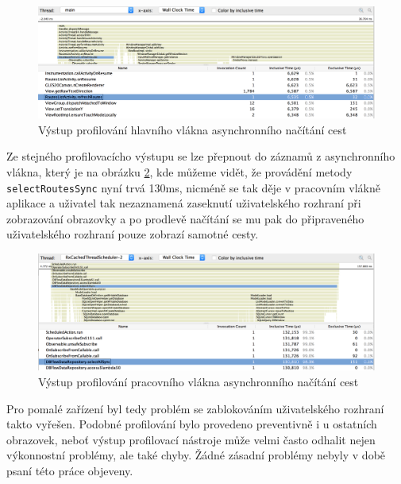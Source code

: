 \documentclass[czech,master,public,dept460,male,java,cpdeclaration]{diploma}
\begin{document}
 \begin{figure}[H]
           \centering
                   \includegraphics[scale=0.38]{img/AsyncRoutesMainThread.png}
           \caption{Výstup profilování hlavního vlákna asynchronního načítání cest}
           \label{fig:asyncroutesmainthread}
   \end{figure}

Ze stejného profilovacícho výstupu se lze přepnout do záznamů z asynchronního vlákna, který je
na obrázku \ref{fig:asyncroutesrxthread}, kde můžeme vidět, že provádění metody
\texttt{selectRoutesSync} nyní trvá 130ms, nicméně se tak děje v pracovním vlákně aplikace a uživatel
 tak nezaznamená zaseknutí uživatelského rozhraní při zobrazování obrazovky a po prodlevě načítání
 se mu pak do připraveného uživatelského rozhraní pouze zobrazí samotné cesty.

    \begin{figure}[H]
              \centering
                      \includegraphics[scale=0.38]{img/AsyncRoutesRxThread.png}
              \caption{Výstup profilování pracovního vlákna asynchronního načítání cest}
              \label{fig:asyncroutesrxthread}
      \end{figure}

Pro pomalé zařízení byl tedy problém se zablokováním uživatelského rozhraní takto vyřešen. Podobné
profilování bylo provedeno preventivně i u ostatních obrazovek, neboť výstup profilovací nástroje může
velmi často odhalit nejen výkonnostní problémy, ale také chyby. Žádné zásadní problémy nebyly
v době psaní této práce objeveny.
\end{document}
